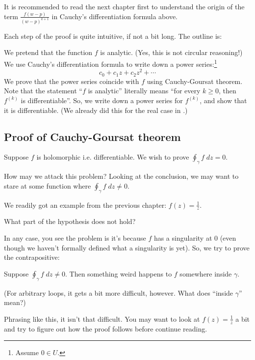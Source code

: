 It is recommended to read the next chapter first to understand the origin of the term
$\frac{f(w-p)}{(w-p)^{k+1}}$ in Cauchy's differentiation formula above.

Each step of the proof is quite intuitive, if not a bit long.
The outline is:
\begin{itemize}
	\ii We pretend that the function $f$ is analytic. (Yes, this is not circular reasoning!)
	\ii We use Cauchy's differentiation formula to write down a power series:\footnote{Assume $0 \in
	U$.}
	\[ c_0 + c_1 z + c_2 z^2 + \cdots \]
	\ii We prove that the power series coincide with $f$ using Cauchy-Goursat theorem.
	\ii Note that the statement ``$f$ is analytic'' literally means ``for every $k \geq 0$, then
	$f^{(k)}$ is differentiable''. So, we write down a power series for $f^{(k)}$, and show that it
	is differentiable.
	(We already did this for the real case in .)
\end{itemize}

\subsection{Proof of Cauchy-Goursat theorem}

Suppose $f$ is holomorphic i.e. differentiable. We wish to prove $\oint_\gamma f \; dz = 0$.

How may we attack this problem? Looking at the conclusion, we may want to stare at some function
where $\oint_\gamma f \; dz \neq 0$.

We readily got an example from the previous chapter: $f(z) = \frac{1}{z}$.
\begin{ques}
	What part of the hypothesis does not hold?
\end{ques}

In any case, you see the problem is it's because $f$ has a singularity at $0$ (even though we
haven't formally defined what a singularity is yet). So, we try to prove the contrapositive:
\begin{theorem}
	Suppose $\oint_\gamma f \; dz \neq 0$.
	Then something weird happens to $f$ somewhere inside $\gamma$.
\end{theorem}
(For arbitrary loops, it gets a bit more difficult, however. What does ``inside $\gamma$'' mean?)

Phrasing like this, it isn't that difficult. You may want to look at $f(z) = \frac{1}{z}$ a bit and
try to figure out how the proof follows before continue reading.

